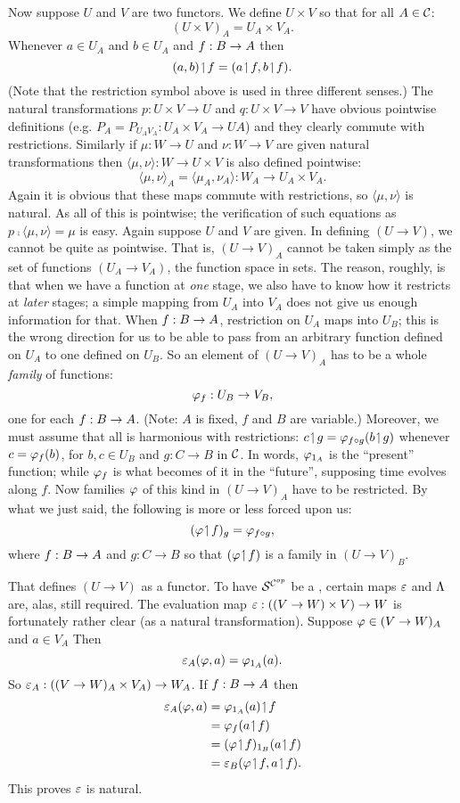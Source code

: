 Now suppose $U$ and $V$ are two functors. We define $U \times V$ so that for all $A \in
\mathcal C$:
$$
(U \times V)_A = U_A \times V_A .
$$
%
Whenever $a \in U_A$ and $b \in U_A$ and $f: B \rightarrow A$ then
$$
(a,b) \!\upharpoonleft\! f = (a \!\upharpoonleft\! f, b \!\upharpoonleft\! f) .
$$
(Note that the restriction symbol above is used in three different senses.) The natural
transformations $p : U \times V \to U$ and $q: U\times V \to V$ have obvious pointwise
definitions  (e.g. $P_A= P_{{U_A}{V_A}} : U_A \times V_A \to UA$) and they clearly commute
with restrictions. Similarly if $\mu: W \to U$ and $\nu: W\to V$ are given natural
transformations then $\langle \mu, \nu \rangle: W \to U \times V$ is also defined
pointwise:
$$
{\langle \mu, \nu \rangle}_A = \langle \mu_A, \nu_A \rangle : W_A \to U_A \times V_A .
$$
%
Again it is obvious that these maps commute with restrictions, so ${\langle \mu, \nu
\rangle}$ is natural. As all of this is pointwise; the verification of such equations as
$p \comp \langle \mu, \nu \rangle = \mu$ is easy. Again suppose $U$ and $V$ are given. In
defining $(U \to V)$, we cannot be quite as pointwise. That is, $(U \to V)_A$ cannot be
taken simply as the set of functions $(U_A \to V_A)$, the function space in sets. The
reason, roughly, is that when we have a function at {\it one} stage, we also have to know
how it restricts at {\it later} stages; a simple mapping from $U_A$ into $V_A$ does not
give us enough information for that. When $f : B \rightarrow A$, restriction on $U_A$ maps into $U_B$;
this is the wrong direction for us to be able to pass from an arbitrary function defined
on $U_A$ to one defined on $U_B$. So an element of $(U \to V)_A$ has to be a whole {\it
family} of functions:
$$
\varphi_f: U_B \rightarrow V_B,
$$
%
one for each $f: B \rightarrow A$. (Note: $A$ is fixed, $f$ and $B$ are variable.) Moreover, we must
assume that all is harmonious with restrictions: $c \!\upharpoonleft\! g = \varphi_{f \circ g} (b \!\upharpoonleft\! g)$
whenever $c = \varphi_f(b)$, for $b,c \in U_B$ and $g : C\to B$ in $\mathcal C$. In words,
$\varphi_{{\mathrm 1}_A}$ is the ``present'' function; while $\varphi_f$ is what becomes of it in the
``future'', supposing time evolves along $f$. Now families $\varphi$ of this kind in $(U\to
V)_A$ have to be restricted. By what we just said, the following is more or less forced
upon us:
$$
(\varphi \!\upharpoonleft\! f)_g = \varphi_{f\circ g},
$$
%
where $f : B \rightarrow A$ and $g: C\to B$ so that $(\varphi \!\upharpoonleft\! f)$ is a family in $(U\to V)_B$.

That defines $(U\to V)$ as a functor. To have $\mathcal S^{\mathcal C^{op}}$ be a \ccc, certain maps $\varepsilon$ and
$\Lambda$ are, alas, still required. The evaluation map $\varepsilon : ((V\rightarrow W) \times V) \rightarrow W$ is
fortunately rather clear (as a natural transformation). Suppose $\varphi \in (V \rightarrow W)_A$
and $a \in V_A$ Then
$$
\varepsilon_A(\varphi, a) = \varphi_{{\mathrm 1}_A} (a).
$$
%
So $\varepsilon_A : ((V \rightarrow W)_A \times V_A) \rightarrow W_A$. If $f: B \rightarrow A$ then
\begin{align*}
\ev_A(\ffam, a) &= \ffam_{\id_A}(a) \res f\\
&= \ffam_f(a \res f)\\
&= (\ffam \res f)_{\id_B} (a \res f)\\
&= \ev_B(\ffam \res f, a \res f).
\end{align*}
%
This proves $\varepsilon$ is natural.


